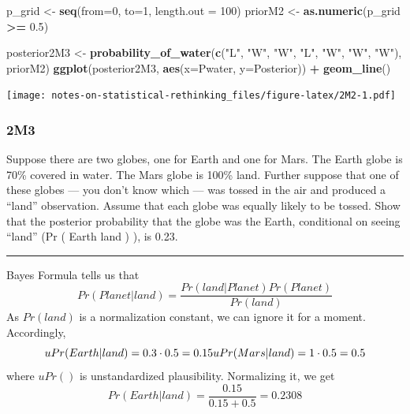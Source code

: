 \documentclass[
]{book}
\newenvironment{Shaded}{\begin{snugshade}}{\end{snugshade}}
\newcommand{\DataTypeTok}[1]{\textcolor[rgb]{0.13,0.29,0.53}{#1}}
\newcommand{\DecValTok}[1]{\textcolor[rgb]{0.00,0.00,0.81}{#1}}
\newcommand{\FloatTok}[1]{\textcolor[rgb]{0.00,0.00,0.81}{#1}}
\newcommand{\KeywordTok}[1]{\textcolor[rgb]{0.13,0.29,0.53}{\textbf{#1}}}
\newcommand{\NormalTok}[1]{#1}
\newcommand{\OperatorTok}[1]{\textcolor[rgb]{0.81,0.36,0.00}{\textbf{#1}}}
\newcommand{\StringTok}[1]{\textcolor[rgb]{0.31,0.60,0.02}{#1}}
\begin{document}
\begin{Shaded}
\begin{Highlighting}[]
\NormalTok{p\_grid \textless{}{-}}\StringTok{ }\KeywordTok{seq}\NormalTok{(}\DataTypeTok{from=}\DecValTok{0}\NormalTok{, }\DataTypeTok{to=}\DecValTok{1}\NormalTok{, }\DataTypeTok{length.out =} \DecValTok{100}\NormalTok{)}
\NormalTok{priorM2 \textless{}{-}}\StringTok{ }\KeywordTok{as.numeric}\NormalTok{(p\_grid }\OperatorTok{\textgreater{}=}\StringTok{ }\FloatTok{0.5}\NormalTok{)}

\NormalTok{posterior2M3 \textless{}{-}}\StringTok{ }\KeywordTok{probability\_of\_water}\NormalTok{(}\KeywordTok{c}\NormalTok{(}\StringTok{"L"}\NormalTok{, }\StringTok{"W"}\NormalTok{, }\StringTok{"W"}\NormalTok{, }\StringTok{"L"}\NormalTok{, }\StringTok{"W"}\NormalTok{, }\StringTok{"W"}\NormalTok{, }\StringTok{"W"}\NormalTok{), priorM2)}
\KeywordTok{ggplot}\NormalTok{(posterior2M3, }\KeywordTok{aes}\NormalTok{(}\DataTypeTok{x=}\NormalTok{Pwater, }\DataTypeTok{y=}\NormalTok{Posterior)) }\OperatorTok{+}\StringTok{ }
\StringTok{  }\KeywordTok{geom\_line}\NormalTok{() }
\end{Highlighting}
\end{Shaded}

\texttt{[image: notes-on-statistical-rethinking\_files/figure-latex/2M2-1.pdf]}

\hypertarget{m3}{%
\subsubsection*{2M3}\label{m3}}

Suppose there are two globes, one for Earth and one for Mars. The Earth globe is 70\% covered in water. The Mars globe is 100\% land. Further suppose that one of these globes --- you don't know which --- was tossed in the air and produced a ``land'' observation. Assume that each globe was equally likely to be tossed. Show that the posterior probability that the globe was the Earth, conditional on seeing ``land'' (Pr ( Earth \textbar{} land ) ), is 0.23.

\begin{center}\rule{0.5\linewidth}{0.5pt}\end{center}

Bayes Formula tells us that
\[Pr(Planet | land) = \frac{Pr(land | Planet) Pr(Planet)}{Pr(land)}\]
As \(Pr(land)\) is a normalization constant, we can ignore it for a moment. Accordingly,
\[uPr(Earth | land) = 0.3 \cdot 0.5 = 0.15\\
uPr(Mars | land) = 1 \cdot 0.5 = 0.5\]
where \(uPr()\) is unstandardized plausibility. Normalizing it, we get
\[Pr(Earth | land) = \frac{0.15}{0.15 + 0.5} = 0.2308\]
\end{document}
